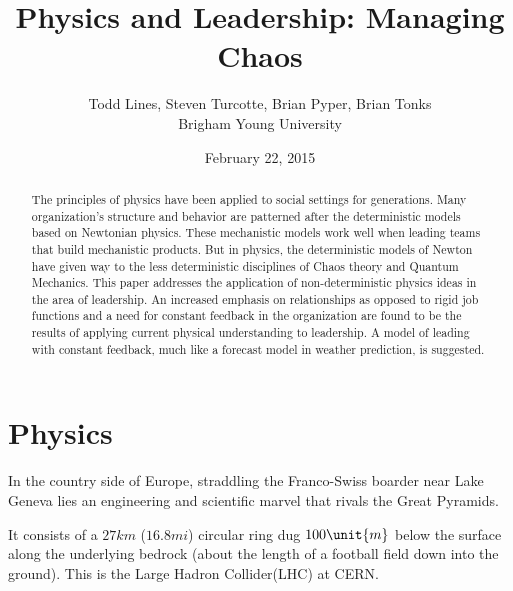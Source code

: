 \documentclass{article}
\begin{document}
\title{Physics and Leadership: Managing Chaos}
\author{Todd Lines, Steven Turcotte, Brian Pyper, Brian Tonks \\
Brigham Young University}
\date{February 22, 2015}
\maketitle

\begin{abstract}
The principles of physics have been applied to social settings for
generations. Many organization's structure and behavior are patterned after
the deterministic models based on Newtonian physics. These mechanistic
models work well when leading teams that build mechanistic products. But in
physics, the deterministic models of Newton have given way to the less
deterministic disciplines of Chaos theory and Quantum Mechanics. This paper
addresses the application of non-deterministic physics ideas in the area of
leadership. An increased emphasis on relationships as opposed to rigid job
functions and a need for constant feedback in the organization are found to
be the results of applying current physical understanding to leadership. A
model of leading with constant feedback, much like a forecast model in
weather prediction, is suggested.
\end{abstract}

\section{Physics}

In the country side of Europe, straddling the Franco-Swiss boarder near Lake
Geneva lies an engineering and scientific marvel that rivals the Great
Pyramids.

It consists of a $27\unit{km}$ ($16.8\unit{mi}$) circular ring dug $100\unit{%
m}$ below the surface along the underlying bedrock (about the length of a
football field down into the ground). This is the Large Hadron Collider(LHC)
at CERN.
\end{document}
